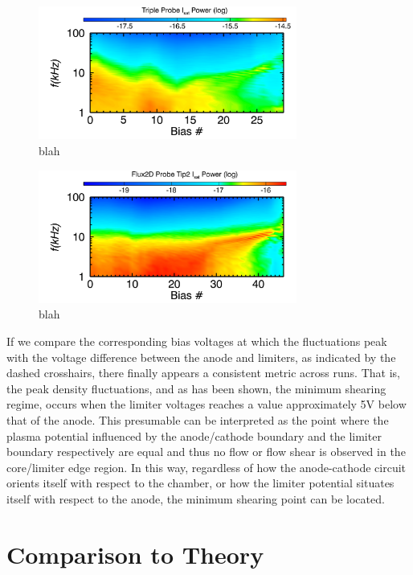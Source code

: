 \documentclass[aip,pop,amsmath,amssymb,preprint,superscriptaddress]{revtex4-1} %
\begin{document}
\begin{figure}[!htbp]
\centerline{
\includegraphics[width=8.5cm]{trip_flucs}}
\caption{\label{fig:trip_flucs} blah}
\end{figure}

\begin{figure}[!htbp]
\centerline{
\includegraphics[width=8.5cm]{flux_flucs_feb12}}
\caption{\label{fig:flux_flucs_feb12} blah}
\end{figure}

If we compare the corresponding bias voltages at which the fluctuations peak with the voltage difference between the anode and limiters, as indicated by the dashed crosshairs, there finally appears a consistent metric across runs. That is, the peak density fluctuations, and as has been shown, the minimum shearing regime, occurs when the limiter voltages reaches a value approximately 5V below that of the anode. This presumable can be interpreted as the point where the plasma potential influenced by the anode/cathode boundary and the limiter boundary respectively are equal and thus no flow or flow shear is observed in the core/limiter edge region. In this way, regardless of how the anode-cathode circuit orients itself with respect to the chamber, or how the limiter potential situates itself with respect to the anode, the minimum shearing point can be located.

\section{Comparison to Theory}
\end{document}
